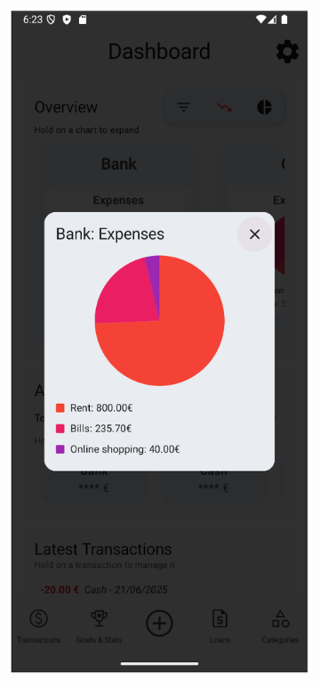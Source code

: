 \documentclass[a4paper,12pt]{article}
\begin{document}
\begin{figure}[H]
\begin{subfigure}[b]{0.23\textwidth}
        \label{fig:dashboard_overview}
    \end{subfigure}
    \hfill
    \begin{subfigure}[b]{0.23\textwidth}
        \includegraphics[width=\textwidth]{chart_dialog_pie.png}

\end{subfigure}
\end{figure}
\end{document}
